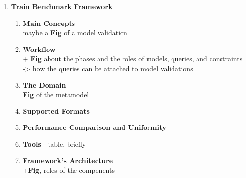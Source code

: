 \begin{enumerate}
		
		
	\item \textbf{Train Benchmark Framework}
		\begin{enumerate}[label*=\arabic*.]
			\item \textbf{Main Concepts} \\ maybe a \textbf{Fig} of a model validation
			\item \textbf{Workflow}\\+ \textbf{Fig} about the phases and the roles of models, queries, and constraints -> how the queries can be attached to model validations
			\item \textbf{The Domain} \\\textbf{Fig} of the metamodel
			\item \textbf{Supported Formats}
			\item \textbf{Performance Comparison and Uniformity}
			\item \textbf{Tools} - table, briefly
			\item \textbf{Framework's Architecture} \\+\textbf{Fig}, roles of the components
		\end{enumerate}
		

\end{enumerate}
